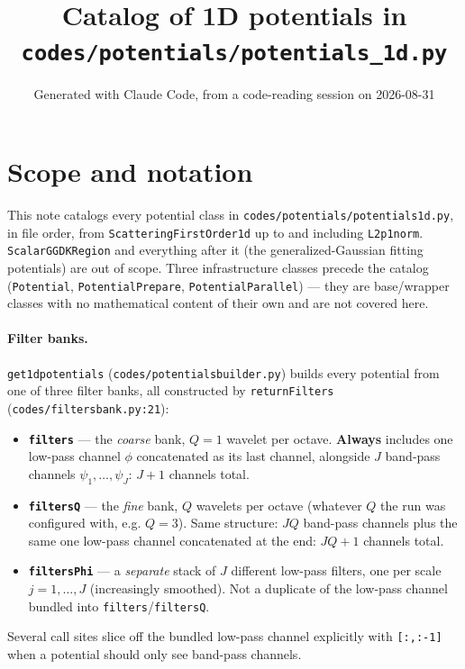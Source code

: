 \documentclass[11pt]{article}
\title{Catalog of 1D potentials in \texttt{codes/potentials/potentials\_1d.py}}
\author{Generated with Claude Code, from a code-reading session on 2026-08-31}
\date{}
\newcommand{\code}[1]{\texttt{#1}}
\renewcommand{\_}{\origunderscore\allowbreak} %
\begin{document}
\maketitle

\section*{Scope and notation}

This note catalogs every potential class in \code{codes/potentials/potentials\_1d.py},
in file order, from \code{Scattering\_First\_Order\_1d} up to and including
\code{L2p1\_norm}. \code{Scalar\_GGD\_KRegion} and everything after it (the
generalized-Gaussian fitting potentials) are out of scope. Three infrastructure
classes precede the catalog (\code{Potential}, \code{Potential\_Prepare},
\code{Potential\_Parallel}) — they are base/wrapper classes with no mathematical
content of their own and are not covered here.

\paragraph{Filter banks.} \code{get\_1d\_potentials} (\code{codes/potentials\_builder.py})
builds every potential from one of three filter banks, all constructed by
\code{return\_Filters} (\code{codes/filters\_bank.py:21}):
\begin{itemize}
  \item \textbf{\code{filters}} — the \emph{coarse} bank, $Q=1$ wavelet per octave.
        \textbf{Always} includes one low-pass channel $\phi$ concatenated as its
        last channel, alongside $J$ band-pass channels $\psi_1,\dots,\psi_J$: $J+1$
        channels total.
  \item \textbf{\code{filters\_Q}} — the \emph{fine} bank, $Q$ wavelets per octave
        (whatever $Q$ the run was configured with, e.g. $Q=3$). Same structure:
        $JQ$ band-pass channels plus the same one low-pass channel concatenated
        at the end: $JQ+1$ channels total.
  \item \textbf{\code{filters\_Phi}} — a \emph{separate} stack of $J$ different
        low-pass filters, one per scale $j=1,\dots,J$ (increasingly smoothed).
        Not a duplicate of the low-pass channel bundled into \code{filters}/\code{filters\_Q}.
\end{itemize}
Several call sites slice off the bundled low-pass channel explicitly with
\code{[:,:-1]} when a potential should only see band-pass channels.
\end{document}
